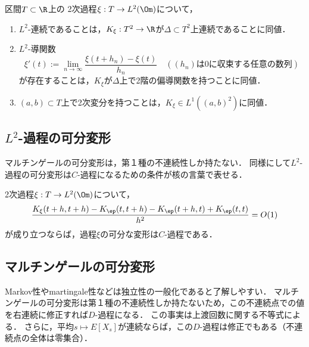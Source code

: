 \documentclass[uplatex,dvipdfmx]{jsreport}
\begin{document}
\begin{lemma}
    区間$T\subset\R$上の
    2次過程$\xi:T\to L^2(\Om)$について，
    \begin{enumerate}
        \item $L^2$-連続であることは，$K_\xi:T^2\to\R$が$\Delta\subset T^2$上連続であることに同値．
        \item $L^2$-導関数
        \[\xi'(t):=\lim_{n\to\infty}\frac{\xi(t+h_n)-\xi(t)}{h_n}\quad((h_n)\text{は0に収束する任意の数列})\]
        が存在することは，$K_\xi$が$\Delta$上で2階の偏導関数を持つことに同値．
        \item $(a,b)\subset T$上で2次変分を持つことは，$K_\xi\in L^1((a,b)^2)$に同値．
    \end{enumerate}
\end{lemma}

\subsection{$L^2$-過程の可分変形}

\begin{tcolorbox}[colframe=ForestGreen, colback=ForestGreen!10!white,breakable,colbacktitle=ForestGreen!40!white,coltitle=black,fonttitle=\bfseries\sffamily,
title=]
    マルチンゲールの可分変形は，第１種の不連続性しか持たない．
    同様にして$L^2$-過程の可分変形は$C$-過程になるための条件が核の言葉で表せる．
\end{tcolorbox}

\begin{theorem}
    2次過程$\xi:T\to L^2(\Om)$について，
    \[\frac{K_\xi(t+h,t+h)-K_\ep(t,t+h)-K_\ep(t+h,t)+K_\ep(t,t)}{h^2}=O(1)\]
    が成り立つならば，過程$\xi$の可分な変形は$C$-過程である．
\end{theorem}

\subsection{マルチンゲールの可分変形}

\begin{tcolorbox}[colframe=ForestGreen, colback=ForestGreen!10!white,breakable,colbacktitle=ForestGreen!40!white,coltitle=black,fonttitle=\bfseries\sffamily,
    title=]
    Markov性やmartingale性などは独立性の一般化であると了解しやすい．
    マルチンゲールの可分変形は第１種の不連続性しか持たないため，この不連続点での値を右連続に修正すれば$D$-過程になる．
    この事実は上渡回数に関する不等式による．
    さらに，平均$s\mapsto E[X_s]$が連続ならば，この$D$-過程は修正でもある（不連続点の全体は零集合）．
\end{tcolorbox}
\end{document}
